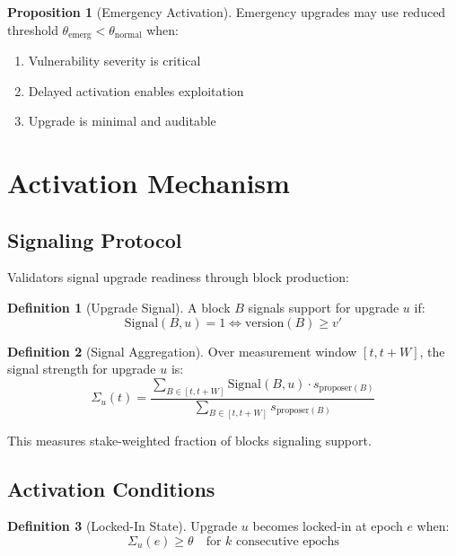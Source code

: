 \documentclass[11pt,a4paper]{article}
\theoremstyle{definition}
\newtheorem{definition}{Definition}[section]
\newtheorem{proposition}[theorem]{Proposition}
\theoremstyle{remark}
\begin{document}
\begin{proposition}[Emergency Activation]
Emergency upgrades may use reduced threshold $\theta_{\text{emerg}} < \theta_{\text{normal}}$ when:
\begin{enumerate}
    \item Vulnerability severity is critical
    \item Delayed activation enables exploitation
    \item Upgrade is minimal and auditable
\end{enumerate}
\end{proposition}

\section{Activation Mechanism}

\subsection{Signaling Protocol}

Validators signal upgrade readiness through block production:

\begin{definition}[Upgrade Signal]
A block $B$ signals support for upgrade $u$ if:
\begin{equation}
    \text{Signal}(B, u) = 1 \iff \text{version}(B) \geq v'
\end{equation}
\end{definition}

\begin{definition}[Signal Aggregation]
Over measurement window $[t, t+W]$, the signal strength for upgrade $u$ is:
\begin{equation}
    \Sigma_u(t) = \frac{\sum_{B \in [t, t+W]} \text{Signal}(B, u) \cdot s_{\text{proposer}(B)}}{\sum_{B \in [t, t+W]} s_{\text{proposer}(B)}}
\end{equation}
\end{definition}

This measures stake-weighted fraction of blocks signaling support.

\subsection{Activation Conditions}

\begin{definition}[Locked-In State]
Upgrade $u$ becomes locked-in at epoch $e$ when:
\begin{equation}
    \Sigma_u(e) \geq \theta \quad \text{for } k \text{ consecutive epochs}
\end{equation}
\end{definition}
\end{document}
